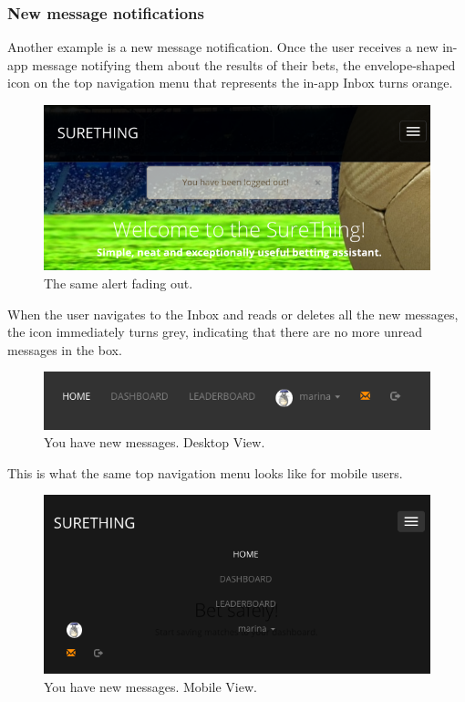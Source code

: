 \subsubsection*{New message notifications}
Another example is a new message notification. Once the user receives a new in-app message notifying them about the results of their bets, the envelope-shaped icon on the top navigation menu that represents the in-app Inbox turns orange.

\begin{figure}[H]
	\begin{center}
		\includegraphics[width=.60\textwidth]{impl/images/alertFadeOut}
		\caption{The same alert fading out.} \label{fig:alertFadeOut}
	\end{center}
\end{figure}

When the user navigates to the Inbox and reads or deletes all the new messages, the icon immediately turns grey, indicating that there are no more unread messages in the box.
\begin{figure}[H]
	\begin{center}
		\includegraphics[width=.60\textwidth]{impl/images/newMessagesDesktopView}
		\caption{You have new messages. Desktop View.} \label{fig:newmessagesdesktopview}
	\end{center}
\end{figure}

This is what the same top navigation menu looks like for mobile users.

\begin{figure}[H]
	\begin{center}
		\includegraphics[width=.60\textwidth]{impl/images/newMessagesMobileView}
		\caption{You have new messages. Mobile View.} \label{fig:newmessagesmobileview}
	\end{center}
\end{figure}


